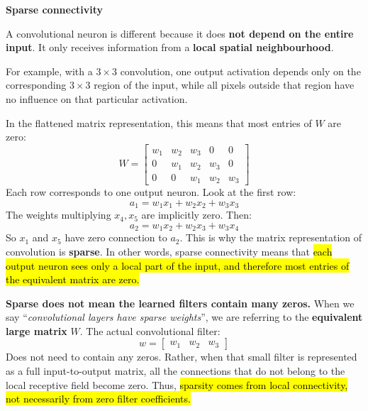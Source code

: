 \highspace
\begin{flushleft}
    \textcolor{Green3}{ \textbf{Sparse connectivity}}
\end{flushleft}
A convolutional neuron is different because it does \textbf{not depend on the entire input}. It only receives information from a \textbf{local spatial neighbourhood}.

\highspace
For example, with a $3 \times 3$ convolution, one output activation depends only on the corresponding $3 \times 3$ region of the input, while all pixels outside that region have no influence on that particular activation.

\highspace
In the flattened matrix representation, this means that most entries of $W$ are zero:
\begin{equation*}
    W =
    \begin{bmatrix}
    w_1 & w_2 & w_3 & 0 & 0 \\
    0 & w_1 & w_2 & w_3 & 0 \\
    0 & 0 & w_1 & w_2 & w_3
    \end{bmatrix}
\end{equation*}
Each row corresponds to one output neuron. Look at the first row:
\begin{equation*}
    a_1 = w_1 x_1 + w_2 x_2 + w_3 x_3
\end{equation*}
The weights multiplying $x_4, x_5$ are implicitly zero. Then:
\begin{equation*}
    a_2 = w_1 x_2 + w_2 x_3 + w_3 x_4
\end{equation*}
So $x_1$ and $x_5$ have zero connection to $a_2$. This is why the matrix representation of convolution is \textbf{sparse}. In other words, sparse connectivity means that \hl{each output neuron sees only a local part of the input, and therefore most entries of the equivalent matrix are zero.}

\highspace
\textcolor{Red2}{ \textbf{Sparse does not mean the learned filters contain many zeros.}} When we say ``\emph{convolutional layers have sparse weights}'', we are referring to the \textbf{equivalent large matrix} $W$. The actual convolutional filter:
\begin{equation*}
    w = \begin{bmatrix}
        w_1 & w_2 & w_3
    \end{bmatrix}
\end{equation*}
Does not need to contain any zeros. Rather, when that small filter is represented as a full input-to-output matrix, all the connections that do not belong to the local receptive field become zero. Thus, \hl{sparsity comes from local connectivity, not necessarily from zero filter coefficients.}

